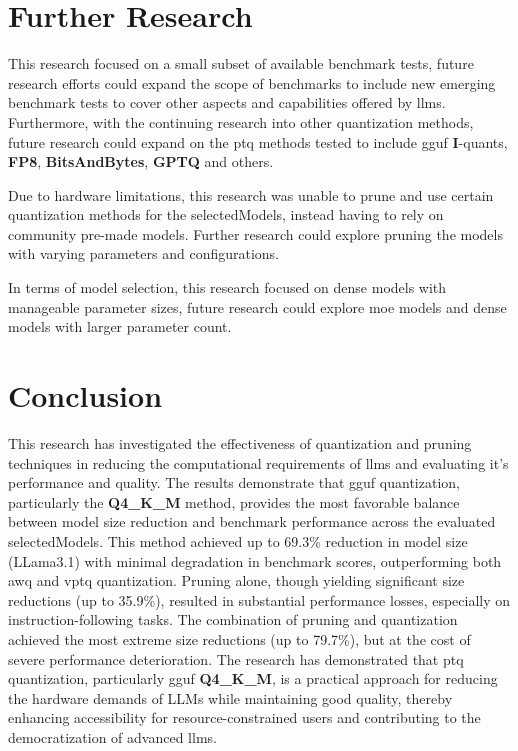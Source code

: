 \documentclass{ifacconf}
\begin{document}
    \section{Further Research}
    This research focused on a small subset of available benchmark tests, future research efforts could expand the scope of benchmarks to include new emerging benchmark tests to cover other aspects and capabilities offered by \glspl{llm}. Furthermore, with the continuing research into other quantization methods, future research could expand on the \gls{ptq} methods tested to include \gls{gguf} \textbf{I}-quants, \textbf{FP8}, \textbf{BitsAndBytes}, \textbf{GPTQ} and others.

    Due to hardware limitations, this research was unable to prune and use certain quantization methods for the \gls{selectedModels}, instead having to rely on community pre-made models. Further research could explore pruning the models with varying parameters and configurations.

    In terms of model selection, this research focused on dense models with manageable parameter sizes, future research could explore \gls{moe} models and dense models with larger parameter count.
	
	\section{Conclusion}
     This research has investigated the effectiveness of quantization and pruning techniques in reducing the computational requirements of \glspl{llm} and evaluating it's performance and quality. The results demonstrate that \gls{gguf} quantization, particularly the \textbf{Q4\_K\_M} method, provides the most favorable balance between model size reduction and benchmark performance across the evaluated \gls{selectedModels}. This method achieved up to 69.3\% reduction in model size (LLama3.1) with minimal degradation in benchmark scores, outperforming both \gls{awq} and \gls{vptq} quantization. Pruning alone, though yielding significant size reductions (up to 35.9\%), resulted in substantial performance losses, especially on instruction-following tasks. The combination of pruning and quantization achieved the most extreme size reductions (up to 79.7\%), but at the cost of severe performance deterioration. The research has demonstrated that \gls{ptq} quantization, particularly \gls{gguf} \textbf{Q4\_K\_M}, is a practical approach for reducing the hardware demands of LLMs while maintaining good quality, thereby enhancing accessibility for resource-constrained users and contributing to the democratization of advanced \glspl{llm}.
	
\end{document}
